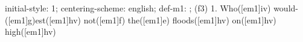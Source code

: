 initial-style: 1;
centering-scheme: english;
def-m1: \grealign;
(f3) 1. Who([em1]iv) would-([em1]g)est([em1]hv) not([em1]f) the([em1]e) floods([em1]hv) on([em1]hv) high([em1]hv)